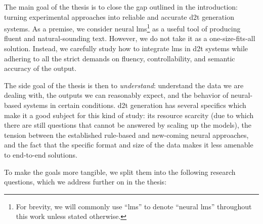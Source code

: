 The main goal of the thesis is to close the gap outlined in the introduction: turning experimental approaches into reliable and accurate \ac{d2t} generation systems. As a premise, we consider neural \acp{lm}\footnote{For brevity, we will commonly use ``\acp{lm}'' to denote ``neural \acp{lm}'' throughout this work unless stated otherwise.} as a useful tool of producing fluent and natural-sounding text.
However, we do not take it as a one-size-fits-all solution. Instead, we carefully study how to integrate \acp{lm} in \ac{d2t} systems while adhering to all the strict demands on fluency, controllability, and semantic accuracy of the output.

The side goal of the thesis is then to \textit{understand}: understand the data we are dealing with, the outputs we can reasonably expect, and the behavior of neural-based systems in certain conditions. \ac{d2t} generation has several specifics which make it a good subject for this kind of study: its resource scarcity (due to which there are still questions that cannot be answered by scaling up the models), the tension between the established rule-based and new-coming neural approaches, and the fact that the specific format and size of the data makes it less amenable to end-to-end solutions.

To make the goals more tangible, we split them into the following research questions, which we address further on in the thesis:

